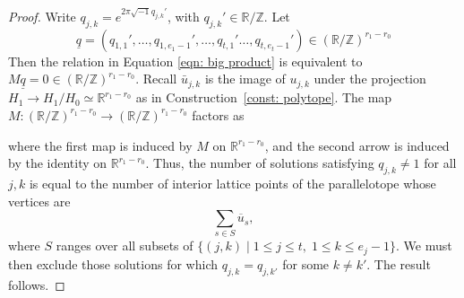 \documentclass{article}
\def\Z{\mathbb{Z}}
\def\R{\mathbb{R}}
\begin{document}
\begin{proof}
    
    Write $q_{j,k} = e^{2\pi \sqrt{-1} q_{j,k}'}$, with $q_{j,k}' \in \mathbb{R}/\mathbb{Z}$. Let 
    $$
    \underline{q} = (q_{1,1}', \ldots, q_{1,e_1-1}', \ldots, q_{t,1}'\ldots, q_{t,e_t-1}') \in (\R/\Z)^{r_1-r_0}
    $$  Then the relation in Equation \eqref{eqn: big product} is equivalent to $M \underline{q}=0 \in (\R/\mathbb{Z})^{r_1 - r_0} $. Recall $\bar{u}_{j,k}$ is the image of $u_{j,k}$ under the projection $H_1 \rightarrow H_1/H_0 \simeq \R^{r_1-r_0}$ as in Construction~\ref{const: polytope}.  The map $M: (\mathbb{R}/\mathbb{Z})^{r_1 - r_0} \rightarrow (\mathbb{R}/\mathbb{Z})^{r_1 - r_0}$  factors as 
    \begin{center}
    \end{center}
    where the first map is induced by $M$ on $\mathbb{R}^{r_1-r_0}$, and the second arrow is induced by the identity on $\mathbb{R}^{r_1 - r_0}$. Thus, the number of solutions satisfying \(q_{j,k} \neq 1\) for all \(j,k\) is equal to the number of interior lattice points of the parallelotope whose vertices are
    \[
    \sum_{s \in S} \overline{u}_s,
    \]
    where \(S\) ranges over all subsets of
    $
    \{(j,k)\mid 1\le j\le t,\; 1\le k\le e_j-1\}.
    $
    We must then exclude those solutions for which \(q_{j,k}=q_{j,k'}\) for some \(k\neq k'\). The result follows.

\end{proof}
\end{document}
